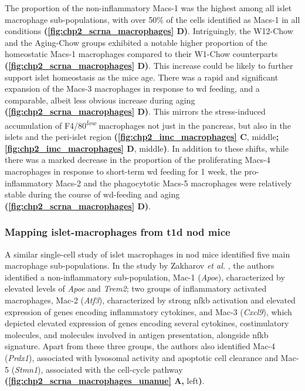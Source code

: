 \par The proportion of the non-inflammatory Macs-1 was the highest among all islet macrophage sub-populations, with over 50\% of the cells identified as Macs-1 in all conditions \textbf{(\autoref{fig:chp2_scrna_macrophages} D)}. Intriguingly, the W12-Chow and the Aging-Chow groups exhibited a notable higher proportion of the homeostatic Macs-1 macrophages compared to their W1-Chow counterparts \textbf{(\autoref{fig:chp2_scrna_macrophages} D)}. This increase could be likely to further support islet homeostasis as the mice age. There was a rapid and significant expansion of the Macs-3 macrophages in response to \gls{wd} feeding, and a comparable, albeit less obvious increase during aging \textbf{(\autoref{fig:chp2_scrna_macrophages} D)}. This mirrors the stress-induced accumulation of F4/80\textsuperscript{\textit{low}} macrophages not just in the pancreas, but also in the islets and the peri-islet region \textbf{(\autoref{fig:chp2_imc_macrophages} C}, middle\textbf{; \autoref{fig:chp2_imc_macrophages} D}, middle\textbf{)}. In addition to these shifts, while there was a marked decrease in the proportion of the proliferating Macs-4 macrophages in response to short-term \gls{wd} feeding for 1 week, the pro-inflammatory Macs-2 and the phagocytotic Macs-5 macrophages were relatively stable during the course of \gls{wd}-feeding and aging \textbf{(\autoref{fig:chp2_scrna_macrophages} D)}.


\subsubsection{\large Mapping islet-macrophages from \gls{t1d} \gls{nod} mice}


A similar single-cell study of islet macrophages in \acrfull{nod} mice identified five main macrophage sub-populations. In the study by Zakharov \textit{et al.} \textbf{\cite{zakharov_single-cell_2020}}, the authors identified a non-inflammatory sub-population, Mac-1 (\textit{Apoe}), characterized by elevated levels of \textit{Apoe} and \textit{Trem2}; two groups of inflammatory activated macrophages, Mac-2 (\textit{Atf3}), characterized by strong \gls{nfkb} activation and elevated expression of genes encoding inflammatory cytokines, and Mac-3 (\textit{Cxcl9}), which depicted elevated expression of genes encoding several cytokines, costimulatory molecules, and molecules involved in antigen presentation, alongside \gls{nfkb} signature. Apart from these three groups, the authors also identified Mac-4 (\textit{Prdx1}), associated with lysosomal activity and apoptotic cell clearance and Mac-5 (\textit{Stmn1}), associated with the cell-cycle pathway \textbf{(\autoref{fig:chp2_scrna_macrophages_unanue} A,} left\textbf{)}.\\

